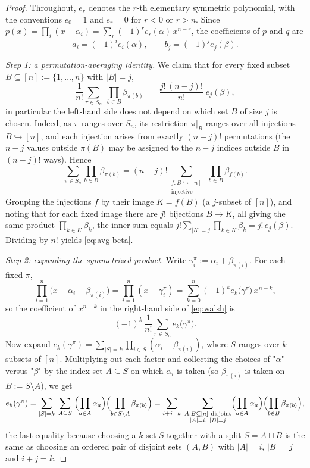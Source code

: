 \begin{proof}
Throughout, $e_r$ denotes the $r$-th elementary symmetric polynomial, with the
conventions $e_0=1$ and $e_r=0$ for $r<0$ or $r>n$. Since
$p(x)=\prod_i(x-\alpha_i)=\sum_{r}(-1)^r e_r(\alpha)\,x^{n-r}$, the coefficients
of $p$ and $q$ are
\begin{equation}\label{eq:vieta}
a_i=(-1)^i e_i(\alpha),\qquad b_j=(-1)^j e_j(\beta).
\end{equation}

\smallskip\noindent\emph{Step 1: a permutation-averaging identity.}
We claim that for every fixed subset $B\subseteq[n]:=\{1,\dots,n\}$ with $|B|=j$,
\begin{equation}\label{eq:avg-beta}
\frac{1}{n!}\sum_{\pi\in S_n}\;\prod_{b\in B}\beta_{\pi(b)}
\;=\;\frac{j!\,(n-j)!}{n!}\;e_j(\beta),
\end{equation}
in particular the left-hand side does not depend on which set $B$ of size $j$ is
chosen. Indeed, as $\pi$ ranges over $S_n$, its restriction $\pi|_B$ ranges over
all injections $B\hookrightarrow[n]$, and each injection arises from exactly
$(n-j)!$ permutations (the $n-j$ values outside $\pi(B)$ may be assigned to the
$n-j$ indices outside $B$ in $(n-j)!$ ways). Hence
\[
\sum_{\pi\in S_n}\prod_{b\in B}\beta_{\pi(b)}
=(n-j)!\!\!\sum_{\substack{f:B\hookrightarrow[n]\\ \text{injective}}}\;\prod_{b\in B}\beta_{f(b)} .
\]
Grouping the injections $f$ by their image $K=f(B)$ (a $j$-subset of $[n]$), and
noting that for each fixed image there are $j!$ bijections $B\to K$, all giving
the same product $\prod_{k\in K}\beta_k$, the inner sum equals
$j!\sum_{|K|=j}\prod_{k\in K}\beta_k=j!\,e_j(\beta)$. Dividing by $n!$ yields
\eqref{eq:avg-beta}.

\smallskip\noindent\emph{Step 2: expanding the symmetrized product.}
Write $\gamma_i^\pi:=\alpha_i+\beta_{\pi(i)}$. For each fixed $\pi$,
\[
\prod_{i=1}^n\bigl(x-\alpha_i-\beta_{\pi(i)}\bigr)
=\prod_{i=1}^n(x-\gamma_i^\pi)
=\sum_{k=0}^n(-1)^k e_k\bigl(\gamma^\pi\bigr)\,x^{n-k},
\]
so the coefficient of $x^{n-k}$ in the right-hand side of \eqref{eq:walsh} is
\begin{equation}\label{eq:rhs-coeff}
(-1)^k\,\frac1{n!}\sum_{\pi\in S_n} e_k\bigl(\gamma^\pi\bigr).
\end{equation}
Now expand $e_k(\gamma^\pi)=\sum_{|S|=k}\prod_{i\in S}(\alpha_i+\beta_{\pi(i)})$,
where $S$ ranges over $k$-subsets of $[n]$. Multiplying out each factor and
collecting the choices of "$\alpha$" versus "$\beta$" by the index set
$A\subseteq S$ on which $\alpha_i$ is taken (so $\beta_{\pi(i)}$ is taken on
$B:=S\setminus A$), we get
\[
e_k(\gamma^\pi)
=\sum_{|S|=k}\;\sum_{A\subseteq S}\;\Bigl(\prod_{a\in A}\alpha_a\Bigr)\Bigl(\prod_{b\in S\setminus A}\beta_{\pi(b)}\Bigr)
=\sum_{i+j=k}\;\sum_{\substack{A,B\subseteq[n]\ \text{disjoint}\\ |A|=i,\ |B|=j}}
\Bigl(\prod_{a\in A}\alpha_a\Bigr)\Bigl(\prod_{b\in B}\beta_{\pi(b)}\Bigr),
\]
the last equality because choosing a $k$-set $S$ together with a split
$S=A\sqcup B$ is the same as choosing an ordered pair of disjoint sets $(A,B)$
with $|A|=i$, $|B|=j$ and $i+j=k$.


\end{proof}
